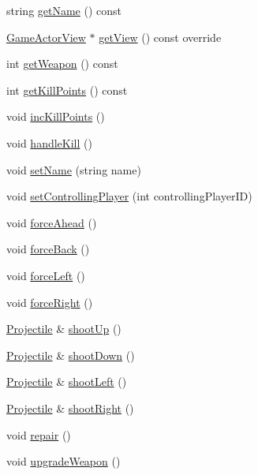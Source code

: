\begin{DoxyCompactItemize}
string \hyperlink{class_spacecraft_aa20e2bdf2564ac896e0889cf621321ae}{get\+Name} () const 
\item 
\hyperlink{class_game_actor_view}{Game\+Actor\+View} $\ast$ \hyperlink{class_spacecraft_ada8aff4825d826f3b8ab6ef3b4430529}{get\+View} () const override
\item 
int \hyperlink{class_spacecraft_ac24eafbec6b3b2a57b9f0ab359d38e56}{get\+Weapon} () const 
\item 
int \hyperlink{class_spacecraft_a3e86b132718ae9644846005f0368d65e}{get\+Kill\+Points} () const 
\item 
void \hyperlink{class_spacecraft_a47aa7a1409fbd782a9cc8fe172f9514b}{inc\+Kill\+Points} ()
\item 
void \hyperlink{class_spacecraft_a4609f3428987bc61e490519a8d1b9ccb}{handle\+Kill} ()
\item 
void \hyperlink{class_spacecraft_a138a3946f5c1453613c681e990b73feb}{set\+Name} (string name)
\item 
void \hyperlink{class_spacecraft_aba6f42e402bf71b69e1b750a20fc567f}{set\+Controlling\+Player} (int controlling\+Player\+I\+D)
\item 
void \hyperlink{class_spacecraft_a9f5f90ddf116970b2e0c194a5504aa76}{force\+Ahead} ()
\item 
void \hyperlink{class_spacecraft_ac425b3e98e397f522bed99559c88eac2}{force\+Back} ()
\item 
void \hyperlink{class_spacecraft_a43ae565de6dbc6cc337f42e408ad363d}{force\+Left} ()
\item 
void \hyperlink{class_spacecraft_a6146562c8ee95b71070108f30afdfc1d}{force\+Right} ()
\item 
\hyperlink{class_projectile}{Projectile} \& \hyperlink{class_spacecraft_a89125988749b1ee29bf1d3f186bc7dd6}{shoot\+Up} ()
\item 
\hyperlink{class_projectile}{Projectile} \& \hyperlink{class_spacecraft_a611409c0d69415ada78ed98d187f0e34}{shoot\+Down} ()
\item 
\hyperlink{class_projectile}{Projectile} \& \hyperlink{class_spacecraft_a904607a42543375dd596aadeef7a5ce4}{shoot\+Left} ()
\item 
\hyperlink{class_projectile}{Projectile} \& \hyperlink{class_spacecraft_a7c626770ca1f4aa24229e72756150f2d}{shoot\+Right} ()
\item 
void \hyperlink{class_spacecraft_a42787ac2585d1826a3471fe38fdce9ae}{repair} ()
\item 
void \hyperlink{class_spacecraft_a41213c1017029fb0ff4c5d9b62b1591f}{upgrade\+Weapon} ()
\end{DoxyCompactItemize}
